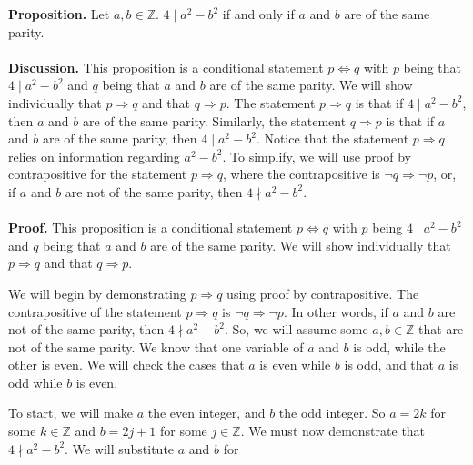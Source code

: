 \documentclass[12pt]{exam}
\begin{document}
\begin{questions}


\question
\textbf{Proposition.} Let $a,b \in \mathbb{Z}$. $4 \mid a^2-b^2$ if and only if $a$ and $b$ are of the same parity.
\\
\\\textbf{Discussion.} This proposition is a conditional statement $p \Leftrightarrow q$ with $p$ being that $4 \mid a^2-b^2$ and $q$ being that $a$ and $b$ are of the same parity. We will show individually that $p \Rightarrow q$ and that $q \Rightarrow p$. The statement $p \Rightarrow q$ is that if $4 \mid a^2-b^2$, then $a$ and $b$ are of the same parity. Similarly, the statement $q \Rightarrow p$ is that if $a$ and $b$ are of the same parity, then $4 \mid a^2-b^2$. Notice that the statement $p \Rightarrow q$ relies on information regarding $a^2-b^2$. To simplify, we will use proof by contrapositive for the statement $p \Rightarrow q$, where the contrapositive is $\neg q \Rightarrow \neg p$, or, if $a$ and $b$ are not of the same parity, then $4 \nmid a^2-b^2$.
\\
\\\textbf{Proof.} This proposition is a conditional statement $p \Leftrightarrow q$ with $p$ being $4 \mid a^2-b^2$ and $q$ being that $a$ and $b$ are of the same parity. We will show individually that $p \Rightarrow q$ and that $q \Rightarrow p$.
\par
We will begin by demonstrating $p \Rightarrow q$ using proof by contrapositive. The contrapositive of the statement $p \Rightarrow q$ is $\neg q \Rightarrow \neg p$. In other words, if $a$ and $b$ are not of the same parity, then $4 \nmid a^2-b^2$. So, we will assume some $a,b \in \mathbb{Z}$ that are not of the same parity. We know that one variable of $a$ and $b$ is odd, while the other is even. We will check the cases that $a$ is even while $b$ is odd, and that $a$ is odd while $b$ is even.
\par
To start, we will make $a$ the even integer, and $b$ the odd integer. So $a = 2k$ for some $k \in \mathbb{Z}$ and $b = 2j +1$ for some $j \in \mathbb{Z}$. We must now demonstrate that $4 \nmid a^2-b^2$. We will substitute $a$ and $b$ for

\end{questions}
\end{document}

